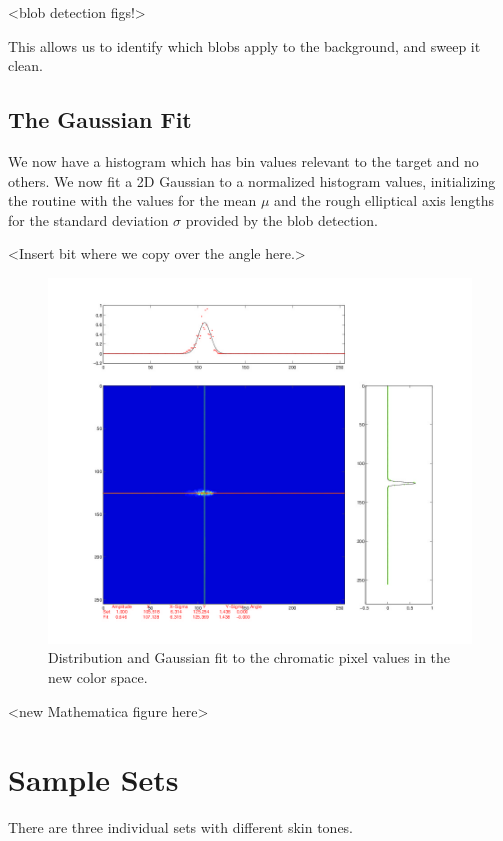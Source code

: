 <blob detection figs!>


This allows us to identify which blobs apply to the background, and sweep it clean.


\subsection{The Gaussian Fit}\label{sec:TheGaussianFit}
We now have a histogram which has bin values relevant to the target and no others. We now fit a 2D Gaussian to a normalized histogram values, initializing the routine with the values for the mean $\mu$ and the rough elliptical axis lengths for the standard deviation $\sigma$ provided by the blob detection.

<Insert bit where we copy over the angle here.>  

\begin{figure}[h!]
  \centering
    \includegraphics[width=\textwidth]{Chapter3/Figs/crosshairFigureFinal.jpg}
    \caption{Distribution and Gaussian fit to the chromatic pixel values in the new color space.}  \label{fig:DistributionAndGaussianFit}
\end{figure}

<new Mathematica figure here>

\section{Sample Sets}\label{sec:SampleSets}
There are three individual sets with different skin tones.



